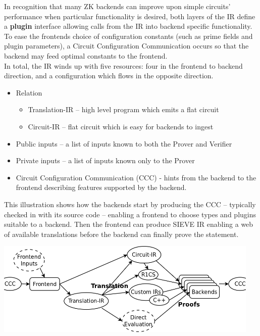In recognition that many ZK backends can improve upon simple circuits' performance when particular functionality is desired, both layers of the IR define a \textbf{plugin} interface allowing calls from the IR into backend specific functionality.\\

To ease the frontends choice of configuration constants (such as prime fields and plugin parameters), a Circuit Configuration Communication occurs so that the backend may feed optimal constants to the frontend. \\

In total, the IR winds up with five resources: four in the frontend to backend direction, and a configuration which flows in the opposite direction.

\begin{itemize}
  \item Relation
  \begin{itemize}
     \item Translation-IR -- high level program which emits a flat circuit
     \item Circuit-IR -- flat circuit which is easy for backends to ingest
  \end{itemize}
  \item Public inputs -- a list of inputs known to both the Prover and Verifier
  \item Private inputs -- a list of inputs known only to the Prover
  \item Circuit Configuration Communication (CCC) - hints from the backend to the frontend describing features supported by the backend.
\end{itemize}

This illustration shows how the backends start by producing the CCC -- typically checked in with its source code -- enabling a frontend to choose types and plugins suitable to a backend.
Then the frontend can produce SIEVE IR enabling a web of available translations before the backend can finally prove the statement.

\noindent \includegraphics[width=0.95\textwidth,center]{ir-dataflow-translation.png} \\

